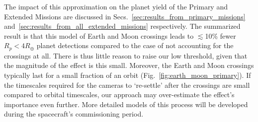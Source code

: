 The impact of this approximation on the planet yield of the Primary and Extended Missions are discussed in Secs.~\ref{sec:results_from_primary_missions} and~\ref{sec:results_from_all_extended_missions} respectively.
The summarized result is that this model of Earth and Moon crossings leads to $\lesssim$10\% fewer $R_p<4R_\oplus$ planet detections compared to the case of not accounting for the crossings at all.
There is thus little reason to raise our low threshold, given that the magnitude of the effect is this small.
Moreover, the Earth and Moon crossings typically last for a small fraction of an orbit (Fig.~\ref{fig:earth_moon_primary}). If the timescales required for the cameras to `re-settle' after the crossings are small compared to orbital timescales, our approach may over-estimate the effect's importance even further.
More detailed models of this process will be developed during the spacecraft's commissioning period.











